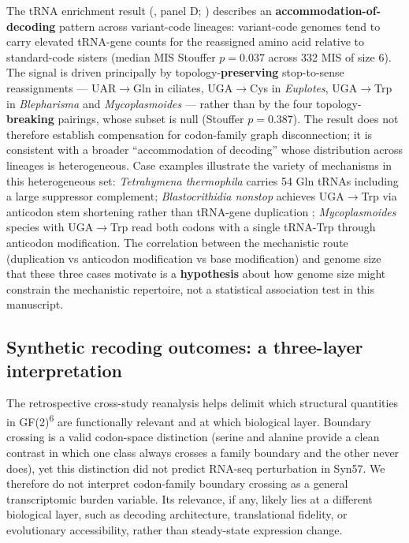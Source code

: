 \documentclass[preprint,11pt,authoryear,a4paper]{elsarticle}
\begin{document}
The tRNA enrichment result (, panel D;
) describes an \textbf{accommodation-of-decoding}
pattern across variant-code lineages: variant-code genomes tend to carry
elevated tRNA-gene counts for the reassigned amino acid relative to
standard-code sisters (median MIS Stouffer \(p = 0.037\) across 332 MIS
of size 6). The signal is driven principally by
topology-\textbf{preserving} stop-to-sense reassignments ---
UAR\(\rightarrow\)Gln in ciliates, UGA\(\rightarrow\)Cys in
\emph{Euplotes}, UGA\(\rightarrow\)Trp in \emph{Blepharisma} and
\emph{Mycoplasmoides} --- rather than by the four
topology-\textbf{breaking} pairings, whose subset is null (Stouffer
\(p = 0.387\)). The result does not therefore establish compensation for
codon-family graph disconnection; it is consistent with a broader
``accommodation of decoding'' whose distribution across lineages is
heterogeneous. Case examples illustrate the variety of mechanisms in
this heterogeneous set: \emph{Tetrahymena thermophila} carries 54 Gln
tRNAs including a large suppressor complement; \emph{Blastocrithidia
nonstop} achieves UGA\(\rightarrow\)Trp via anticodon stem shortening
rather than tRNA-gene duplication \citep{kachale2023};
\emph{Mycoplasmoides} species with UGA\(\rightarrow\)Trp read both
codons with a single tRNA-Trp through anticodon modification. The
correlation between the mechanistic route (duplication vs anticodon
modification vs base modification) and genome size that these three
cases motivate is a \textbf{hypothesis} about how genome size might
constrain the mechanistic repertoire, not a statistical association test
in this manuscript.

\subsection{Synthetic recoding outcomes: a three-layer
interpretation}\label{sec:disc-layers}

The retrospective cross-study reanalysis helps delimit which structural
quantities in GF(2)\textsuperscript{6} are functionally relevant and at
which biological layer. Boundary crossing is a valid codon-space
distinction (serine and alanine provide a clean contrast in which one
class always crosses a family boundary and the other never does), yet
this distinction did not predict RNA-seq perturbation in Syn57. We
therefore do not interpret codon-family boundary crossing as a general
transcriptomic burden variable. Its relevance, if any, likely lies at a
different biological layer, such as decoding architecture, translational
fidelity, or evolutionary accessibility, rather than steady-state
expression change.
\end{document}
